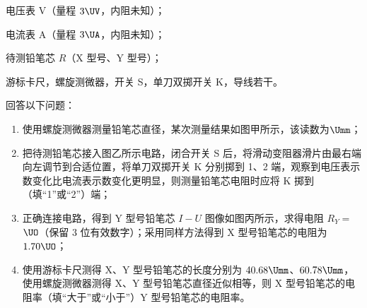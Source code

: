\documentclass[\gkver]{gaokaozhenti}
\begin{document}
\begin{enumerate}
电压表 V（量程 $3 \UV$，内阻未知）；

电流表 A（量程 $3 \UA$，内阻未知）；

待测铅笔芯 $R$（X 型号、Y 型号）；

游标卡尺，螺旋测微器，开关 S，单刀双掷开关 K，导线若干。

回答以下问题：
\begin{enumerate}
	\item
	使用螺旋测微器测量铅笔芯直径，某次测量结果如图甲所示，该读数为$\Umm$；
	\item
	把待测铅笔芯接入图乙所示电路，闭合开关 S 后，将滑动变阻器滑片由最右端向左调节到合适位置，将单刀双掷开关 K 分别掷到 1、2 端，观察到电压表示数变化比电流表示数变化更明显，则测量铅笔芯电阻时应将 K 掷到（填“1”或“2”）端；
	\item
	正确连接电路，得到 Y 型号铅笔芯 $I - U$ 图像如图丙所示，求得电阻 $R_{Y} = $$\UO$（保留 3 位有效数字）；采用同样方法得到 X 型号铅笔芯的电阻为 $1.70 \UO$；
	\item
	使用游标卡尺测得 X、Y 型号铅笔芯的长度分别为 $40.68 \Umm$、$60.78 \Umm$，使用螺旋测微器测得 X、Y 型号铅笔芯直径近似相等，则 X 型号铅笔芯的电阻率（填“大于”或“小于”）Y 型号铅笔芯的电阻率。
\end{enumerate}

\end{enumerate}
\end{document}

